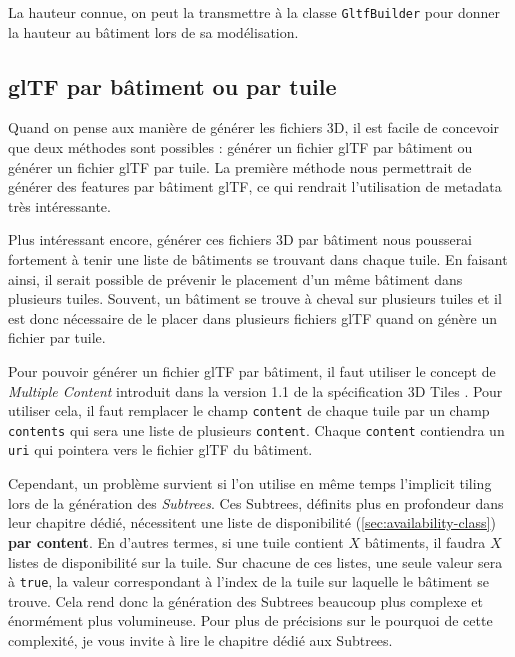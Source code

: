 La hauteur connue, on peut la transmettre à la classe \texttt{GltfBuilder} pour donner la hauteur au bâtiment lors de sa modélisation.

\subsection{glTF par bâtiment ou par tuile}

Quand on pense aux manière de générer les fichiers 3D, il est facile de concevoir que deux méthodes sont possibles : générer un fichier glTF par bâtiment ou générer un fichier glTF par tuile. La première méthode nous permettrait de générer des features par bâtiment glTF, ce qui rendrait l'utilisation de metadata très intéressante.

Plus intéressant encore, générer ces fichiers 3D par bâtiment nous pousserai fortement à tenir une liste de bâtiments se trouvant dans chaque tuile. En faisant ainsi, il serait possible de prévenir le placement d'un même bâtiment dans plusieurs tuiles. Souvent, un bâtiment se trouve à cheval sur plusieurs tuiles et il est donc nécessaire de le placer dans plusieurs fichiers glTF quand on génère un fichier par tuile.

Pour pouvoir générer un fichier glTF par bâtiment, il faut utiliser le concept de \textit{Multiple Content} introduit dans la version 1.1 de la spécification 3D Tiles \cite{3d-tiles-reference-card-v1_1}. Pour utiliser cela, il faut remplacer le champ \texttt{content} de chaque tuile par un champ \texttt{contents} qui sera une liste de plusieurs \texttt{content}. Chaque \texttt{content} contiendra un \texttt{uri} qui pointera vers le fichier glTF du bâtiment.

Cependant, un problème survient si l'on utilise en même temps l'implicit tiling lors de la génération des \textit{Subtrees}. Ces Subtrees, définits plus en profondeur dans leur chapitre dédié, nécessitent une liste de disponibilité (\autoref{sec:availability-class}) \textbf{par content}. En d'autres termes, si une tuile contient $X$ bâtiments, il faudra $X$ listes de disponibilité sur la tuile. Sur chacune de ces listes, une seule valeur sera à \texttt{true}, la valeur correspondant à l'index de la tuile sur laquelle le bâtiment se trouve. Cela rend donc la génération des Subtrees beaucoup plus complexe et énormément plus volumineuse. Pour plus de précisions sur le pourquoi de cette complexité, je vous invite à lire le chapitre dédié aux Subtrees.